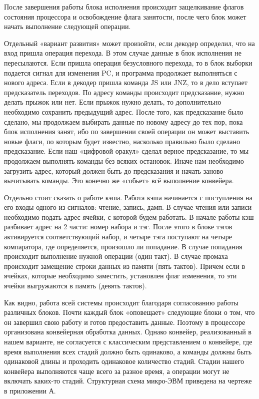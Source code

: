 После завершения работы блока исполнения происходит защелкивание флагов состояния процессора и освобождение флага занятости, после чего блок может начать выполнение следующей операции.

Отдельный «вариант развития» может произойти, если декодер определил, что на вход пришла операция перехода. В этом случае данные в блок исполнения не пересылаются. Если пришла операция безусловного перехода, то в блок выборки подается сигнал для изменения PC, и программа продолжает выполняться с нового адреса. Если в декодер пришла команда JS или JNZ, то в дело вступает предсказатель переходов. По адресу команды происходит предсказание, нужно делать прыжок или нет. Если прыжок нужно делать, то дополнительно необходимо сохранить предыдущий адрес. После того, как предсказание было сделано, мы продолжаем выбирать данные по новому адресу до тех пор, пока блок исполнения занят, ибо по завершении своей операции он может выставить новые флаги, по которым будет известно, насколько правильно было сделано предсказание. Если наш «цифровой оракул» сделал верное предсказание, то мы продолжаем выполнять команды без всяких остановок. Иначе нам необходимо загрузить адрес, который должен быть до предсказания и начать заново вычитывать команды. Это конечно же «собьет» всё выполнение конвейера.

Отдельно стоит сказать о работе кэша. Работа кэша начинается с поступления на его входы одного из сигналов: чтение, запись, дамп. В случае чтения или записи необходимо подать адрес ячейки, с которой будем работать. В начале работы кэш разбивает адрес на 2 части: номер набора и тэг. После этого в блоке тэгов активируется соответствующий набор, и четыре тэга поступают на четыре компаратора, где определяется, произошло ли попадание. В случае попадания происходит выполнение нужной операции (один такт). В случае промаха происходит замещение строки данных из памяти (пять тактов). Причем если в ячейках, которые необходимо заместить,  установлен флаг изменения, то эти ячейки выгружаются в память (девять тактов).

Как видно, работа всей системы происходит благодаря согласованию работы различных блоков. Почти каждый блок «оповещает» следующие блоки о том, что он завершил свою работу и готов предоставить данные. Поэтому в процессоре организована конвейерная обработка данных. Однако конвейер, реализованный в нашем варианте, не согласуется с классическим представлением о конвейере, где время выполнения всех стадий должно быть одинаково, а команды должны быть одинаковой длины и проходить одинаковое количество стадий. Стадии нашего конвейера выполняются чаще всего за разное время, а операции могут не включать каких-то стадий.
Структурная схема микро-ЭВМ приведена на чертеже в приложении А.
